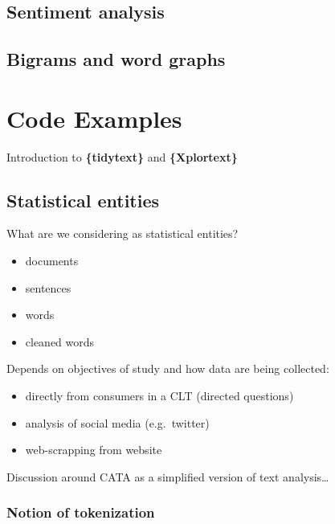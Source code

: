 \documentclass[
]{book}
\providecommand{\tightlist}{%
  \setlength{\itemsep}{0pt}\setlength{\parskip}{0pt}}
\begin{document}
\hypertarget{sentiment-analysis}{%
\subsection{Sentiment analysis}\label{sentiment-analysis}}

\hypertarget{bigrams-and-word-graphs}{%
\subsection{Bigrams and word graphs}\label{bigrams-and-word-graphs}}

\hypertarget{code-examples-1}{%
\section{Code Examples}\label{code-examples-1}}

Introduction to \textbf{\{tidytext\}} and \textbf{\{Xplortext\}}

\hypertarget{statistical-entities}{%
\subsection{Statistical entities}\label{statistical-entities}}

What are we considering as statistical entities?

\begin{itemize}
\tightlist
\item
  documents
\item
  sentences
\item
  words
\item
  cleaned words
\end{itemize}

Depends on objectives of study and how data are being collected:

\begin{itemize}
\tightlist
\item
  directly from consumers in a CLT (directed questions)
\item
  analysis of social media (e.g.~twitter)
\item
  web-scrapping from website
\end{itemize}

Discussion around CATA as a simplified version of text analysis\ldots{}

\hypertarget{notion-of-tokenization}{%
\subsubsection{Notion of tokenization}\label{notion-of-tokenization}}
\end{document}

